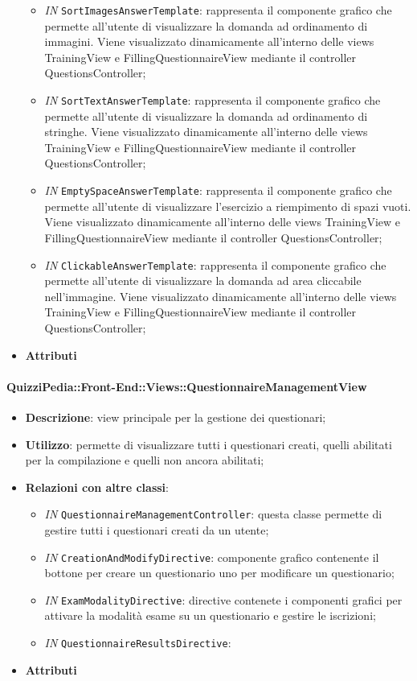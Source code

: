 \begin{itemize}
\begin{itemize}
		\item \textit{IN} \texttt{SortImagesAnswerTemplate}: rappresenta il componente grafico che permette all'utente di visualizzare la domanda ad ordinamento di immagini. Viene visualizzato dinamicamente all'interno delle views TrainingView e FillingQuestionnaireView mediante il controller QuestionsController;
		\item \textit{IN} \texttt{SortTextAnswerTemplate}: rappresenta il componente grafico che permette all'utente di visualizzare la domanda ad ordinamento di stringhe. Viene visualizzato dinamicamente all'interno delle views TrainingView e FillingQuestionnaireView mediante il controller QuestionsController;
		\item \textit{IN} \texttt{EmptySpaceAnswerTemplate}: rappresenta il componente grafico che permette all'utente di visualizzare l'esercizio a riempimento di spazi vuoti. Viene visualizzato dinamicamente all'interno delle views TrainingView e FillingQuestionnaireView mediante il controller QuestionsController;
		\item \textit{IN} \texttt{ClickableAnswerTemplate}: rappresenta il componente grafico che permette all'utente di visualizzare la domanda ad area cliccabile nell'immagine. Viene visualizzato dinamicamente all'interno delle views TrainingView e FillingQuestionnaireView mediante il controller QuestionsController;
	\end{itemize}
	\item \textbf{Attributi}
\end{itemize}

\paragraph{QuizziPedia::Front-End::Views::QuestionnaireManagementView}
\begin{itemize}
	\item \textbf{Descrizione}: view principale per la gestione dei questionari;
	\item \textbf{Utilizzo}: permette di visualizzare tutti i questionari creati, quelli abilitati per la compilazione e quelli non ancora abilitati;
	\item \textbf{Relazioni con altre classi}:
	\begin{itemize}
		\item \textit{IN} \texttt{QuestionnaireManagementController}: questa classe permette di gestire tutti i questionari creati da un utente;
		\item \textit{IN} \texttt{CreationAndModifyDirective}: componente grafico contenente il bottone per creare un questionario uno per modificare un questionario;
		\item \textit{IN} \texttt{ExamModalityDirective}: directive contenete i componenti grafici per attivare la modalità esame su un questionario e gestire le iscrizioni;
		\item \textit{IN} \texttt{QuestionnaireResultsDirective}:
	\end{itemize}
	\item \textbf{Attributi}
\end{itemize}


